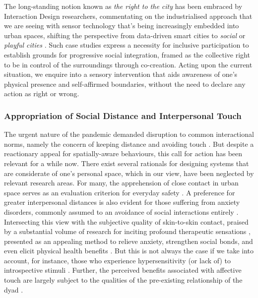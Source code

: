 The long-standing notion known as \textit{the right to the city} has been embraced by Interaction Design researchers, commentating on the industrialised approach that we are seeing with sensor technology that's being increasingly embedded into urban spaces, shifting the perspective from data-driven smart cities to \textit{social} or \textit{playful cities} \citep{castro_seixas_urban_2021,howell_life-affirming_2019}. Such case studies express a necessity for inclusive participation to establish grounds for progressive social integration, framed as the collective right to be in control of the surroundings through co-creation. Acting upon the current situation, we enquire into a sensory intervention that aids awareness of one's physical presence and self-affirmed boundaries, without the need to declare any action as right or wrong.

\subsubsection{Appropriation of Social Distance and Interpersonal Touch}
\label{subsec:safety}

The urgent nature of the pandemic demanded disruption to common interactional norms, namely the concern of keeping distance and avoiding touch \citep{long_covid-19_2021,katila_interaction_2020}. But despite a reactionary appeal for spatially-aware behaviours, this call for action has been relevant for a while now. There exist several rationals for designing systems that are considerate of one's personal space, which in our view, have been neglected by relevant research areas. For many, the apprehension of close contact in urban space serves as an evaluation criterion for everyday safety \citep{farina_moving_2021,peimani_where_2016}. A preference for greater interpersonal distances is also evident for those suffering from anxiety disorders, commonly assumed to an avoidance of social interactions entirely \citep{givon-benjio_biased_2020}. Intersecting this view with the subjective quality of skin-to-skin contact, praised by a substantial volume of research for inciting profound therapeutic sensations \citep{crucianelli_developmental_2020}, presented as an appealing method to relieve anxiety, strengthen social bonds, and even elicit physical health benefits \citep{field_touch_2010,peterson_parents_2007,dolin_reach_1993}. But this is not always the case if we take into account, for instance, those who experience hypersensitivity (or lack of) to introspective stimuli \citep{bischoff-grethe_neural_2018,sivik_alexithymia_1993}. Further, the perceived benefits associated with affective touch are largely subject to the qualities of the pre-existing relationship of the dyad \citep{gulledge2007non}.

